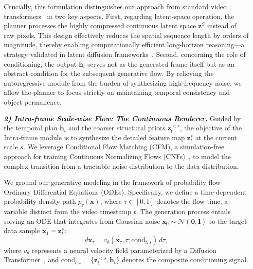 Crucially, this formulation distinguishes our approach from standard video transformers~\cite{yan2021videogpt, rakhimov2020latent} in two key aspects. First, regarding latent-space operation, the planner processes the highly compressed continuous latent space $\boldsymbol{z}^S$ instead of raw pixels. This design effectively reduces the spatial sequence length by orders of magnitude, thereby enabling computationally efficient long-horizon reasoning—a strategy validated in latent diffusion frameworks~\cite{rombach2022high}. Second, concerning the role of conditioning, the output $\boldsymbol{h}_t$ serves not as the generated frame itself but as an abstract condition for the subsequent generative flow. By relieving the autoregressive module from the burden of synthesizing high-frequency noise, we allow the planner to focus strictly on maintaining temporal consistency and object permanence.

\noindent \textit{\textbf{2) Intra-frame Scale-wise Flow: The Continuous Renderer.}}
Guided by the temporal plan $\boldsymbol{h}_t$ and the coarser structural priors $\boldsymbol{z}_t^{<s}$, the objective of the Intra-frame module is to synthesize the detailed feature map $\boldsymbol{z}_t^s$ at the current scale $s$. We leverage Conditional Flow Matching (CFM), a simulation-free approach for training Continuous Normalizing Flows (CNFs)~\cite{lipman2023flow, albergo2025stochastic, dao2023flow}, to model the complex transition from a tractable noise distribution to the data distribution.

We ground our generative modeling in the framework of probability flow Ordinary Differential Equations (ODEs). Specifically, we define a time-dependent probability density path $p_\tau(\boldsymbol{x})$, where $\tau \in [0, 1]$ denotes the flow time, a variable distinct from the video timestamp $t$. The generation process entails solving an ODE that integrates from Gaussian noise $\boldsymbol{x}_0 \sim \mathcal{N}(\boldsymbol{0}, \boldsymbol{I})$ to the target data sample $\boldsymbol{x}_1 = \boldsymbol{z}_t^s$:
\begin{equation}
    d\boldsymbol{x}_\tau = v_\theta(\boldsymbol{x}_\tau, \tau; \text{cond}_{t,s}) \, d\tau,
\end{equation}
where $v_\theta$ represents a neural velocity field parameterized by a Diffusion Transformer~\cite{peebles2023scalable, yao2025reconstruction}, and $\text{cond}_{t,s} = \{ \boldsymbol{z}_t^{<s}, \boldsymbol{h}_t \}$ denotes the composite conditioning signal.

